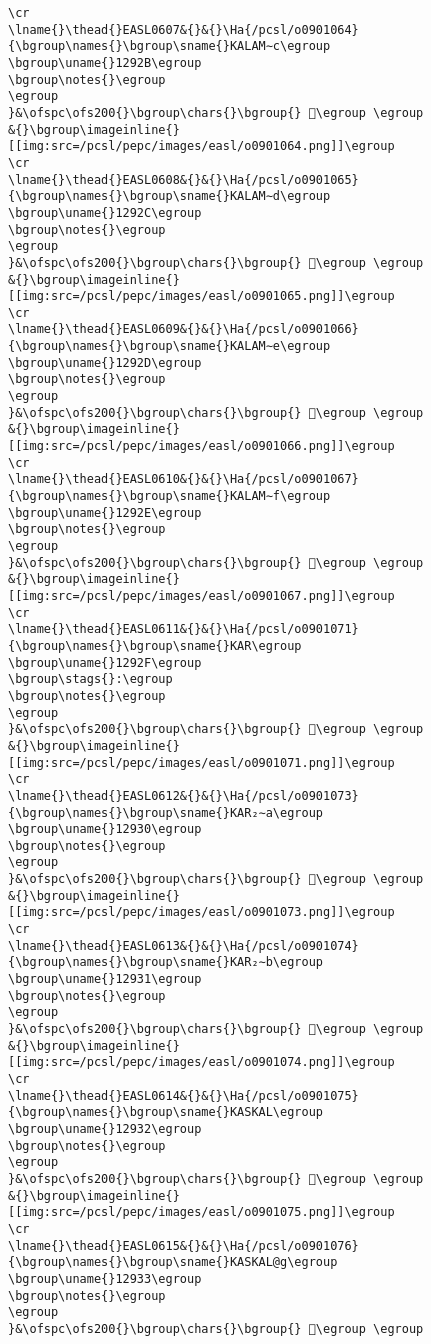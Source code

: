 \begin{verbatim}
\cr
\lname{}\thead{}EASL0607&{}&{}\Ha{/pcsl/o0901064}{\bgroup\names{}\bgroup\sname{}KALAM∼c\egroup
\bgroup\uname{}1292B\egroup
\bgroup\notes{}\egroup
\egroup
}&\ofspc\ofs200{}\bgroup\chars{}\bgroup{} 𒤫\egroup \egroup
&{}\bgroup\imageinline{}[[img:src=/pcsl/pepc/images/easl/o0901064.png]]\egroup
\cr
\lname{}\thead{}EASL0608&{}&{}\Ha{/pcsl/o0901065}{\bgroup\names{}\bgroup\sname{}KALAM∼d\egroup
\bgroup\uname{}1292C\egroup
\bgroup\notes{}\egroup
\egroup
}&\ofspc\ofs200{}\bgroup\chars{}\bgroup{} 𒤬\egroup \egroup
&{}\bgroup\imageinline{}[[img:src=/pcsl/pepc/images/easl/o0901065.png]]\egroup
\cr
\lname{}\thead{}EASL0609&{}&{}\Ha{/pcsl/o0901066}{\bgroup\names{}\bgroup\sname{}KALAM∼e\egroup
\bgroup\uname{}1292D\egroup
\bgroup\notes{}\egroup
\egroup
}&\ofspc\ofs200{}\bgroup\chars{}\bgroup{} 𒤭\egroup \egroup
&{}\bgroup\imageinline{}[[img:src=/pcsl/pepc/images/easl/o0901066.png]]\egroup
\cr
\lname{}\thead{}EASL0610&{}&{}\Ha{/pcsl/o0901067}{\bgroup\names{}\bgroup\sname{}KALAM∼f\egroup
\bgroup\uname{}1292E\egroup
\bgroup\notes{}\egroup
\egroup
}&\ofspc\ofs200{}\bgroup\chars{}\bgroup{} 𒤮\egroup \egroup
&{}\bgroup\imageinline{}[[img:src=/pcsl/pepc/images/easl/o0901067.png]]\egroup
\cr
\lname{}\thead{}EASL0611&{}&{}\Ha{/pcsl/o0901071}{\bgroup\names{}\bgroup\sname{}KAR\egroup
\bgroup\uname{}1292F\egroup
\bgroup\stags{}:\egroup
\bgroup\notes{}\egroup
\egroup
}&\ofspc\ofs200{}\bgroup\chars{}\bgroup{} 𒤯\egroup \egroup
&{}\bgroup\imageinline{}[[img:src=/pcsl/pepc/images/easl/o0901071.png]]\egroup
\cr
\lname{}\thead{}EASL0612&{}&{}\Ha{/pcsl/o0901073}{\bgroup\names{}\bgroup\sname{}KAR₂∼a\egroup
\bgroup\uname{}12930\egroup
\bgroup\notes{}\egroup
\egroup
}&\ofspc\ofs200{}\bgroup\chars{}\bgroup{} 𒤰\egroup \egroup
&{}\bgroup\imageinline{}[[img:src=/pcsl/pepc/images/easl/o0901073.png]]\egroup
\cr
\lname{}\thead{}EASL0613&{}&{}\Ha{/pcsl/o0901074}{\bgroup\names{}\bgroup\sname{}KAR₂∼b\egroup
\bgroup\uname{}12931\egroup
\bgroup\notes{}\egroup
\egroup
}&\ofspc\ofs200{}\bgroup\chars{}\bgroup{} 𒤱\egroup \egroup
&{}\bgroup\imageinline{}[[img:src=/pcsl/pepc/images/easl/o0901074.png]]\egroup
\cr
\lname{}\thead{}EASL0614&{}&{}\Ha{/pcsl/o0901075}{\bgroup\names{}\bgroup\sname{}KASKAL\egroup
\bgroup\uname{}12932\egroup
\bgroup\notes{}\egroup
\egroup
}&\ofspc\ofs200{}\bgroup\chars{}\bgroup{} 𒤲\egroup \egroup
&{}\bgroup\imageinline{}[[img:src=/pcsl/pepc/images/easl/o0901075.png]]\egroup
\cr
\lname{}\thead{}EASL0615&{}&{}\Ha{/pcsl/o0901076}{\bgroup\names{}\bgroup\sname{}KASKAL@g\egroup
\bgroup\uname{}12933\egroup
\bgroup\notes{}\egroup
\egroup
}&\ofspc\ofs200{}\bgroup\chars{}\bgroup{} 𒤳\egroup \egroup

\end{verbatim}
